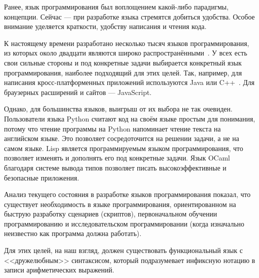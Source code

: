 \introductiontitle
    Ранее, язык программирования был воплощением какой-либо парадигмы, концепции.
    Сейчас --- при разработке языка стремятся добиться удобства.
    Особое внимание уделяется краткости, удобству написания и чтения кода.

    К настоящему времени разработано несколько тысяч языков программирования, из которых около двадцати являются широко распространёнными~\cite{TIOBE}.
    У всех есть свои сильные стороны и под конкретные задачи выбирается конкретный язык программирования, наиболее подходящий для этих целей.
    Так, например, для написания кросс-платформенных приложений используются Java или C++~\cite{p_c_lisp}.
    Для браузерных расширений и сайтов --- JavaScript.

    Однако, для большинства языков, выигрыш от их выбора не так очевиден.
    Пользователи языка Python считают код на своём языке простым для понимания, потому что чтение программы на Python напоминает чтение текста на английском языке.
    Это позволяет сосредоточится на решении задачи, а не на самом языке.
    Lisp является программируемым языком программирования, что позволяет изменять и дополнять его под конкретные задачи.
    Язык OCaml благодаря системе вывода типов позволяет писать высокоэффективные и безопасные приложения.

    Анализ текущего состояния в разработке языков программирования показал, что существует необходимость в языке программирования, ориентированном на быструю разработку сценариев (скриптов), первоначальном обучении программированию и исследовательском программировании (когда изначально неизвестно как программа должна работать).

    Для этих целей, на наш взгляд, должен существовать функциональный язык с <<дружелюбным>> синтаксисом, который подразумевает инфиксную нотацию в записи арифметических выражений.
